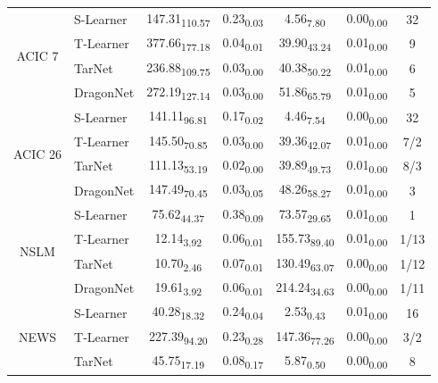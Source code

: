 \begin{table}[ht]
\begin{tabular}{c l cc cc c}
\hline
\multirow{4}{*}{ACIC 7}
& S-Learner  & 147.31\textsubscript{110.57} & 0.23\textsubscript{0.03} & 4.56\textsubscript{7.80} & 0.00\textsubscript{0.00} & 32 \\
& T-Learner  & 377.66\textsubscript{177.18} & 0.04\textsubscript{0.01} & 39.90\textsubscript{43.24} & 0.01\textsubscript{0.00} & 9 \\
& TarNet     & 236.88\textsubscript{109.75} & 0.03\textsubscript{0.00} & 40.38\textsubscript{50.22} & 0.01\textsubscript{0.00} & 6 \\
& DragonNet  & 272.19\textsubscript{127.14} & 0.03\textsubscript{0.00} & 51.86\textsubscript{65.79} & 0.01\textsubscript{0.00} & 5 \\
\hline
\multirow{4}{*}{ACIC 26}
& S-Learner  & 141.11\textsubscript{96.81} & 0.17\textsubscript{0.02} & 4.46\textsubscript{7.54} & 0.00\textsubscript{0.00} & 32 \\
& T-Learner  & 145.50\textsubscript{70.85} & 0.03\textsubscript{0.00} & 39.36\textsubscript{42.07} & 0.01\textsubscript{0.00} & 7/2 \\
& TarNet     & 111.13\textsubscript{53.19} & 0.02\textsubscript{0.00} & 39.89\textsubscript{49.73} & 0.01\textsubscript{0.00} & 8/3 \\
& DragonNet  & 147.49\textsubscript{70.45} & 0.03\textsubscript{0.05} & 48.26\textsubscript{58.27} & 0.01\textsubscript{0.00} & 3 \\
\hline
\multirow{4}{*}{NSLM}
& S-Learner  & 75.62\textsubscript{44.37} & 0.38\textsubscript{0.09} & 73.57\textsubscript{29.65} & 0.01\textsubscript{0.00} & 1 \\
& T-Learner  & 12.14\textsubscript{3.92} & 0.06\textsubscript{0.01} & 155.73\textsubscript{89.40} & 0.01\textsubscript{0.00} & 1/13 \\
& TarNet     & 10.70\textsubscript{2.46} & 0.07\textsubscript{0.01} & 130.49\textsubscript{63.07} & 0.00\textsubscript{0.00} & 1/12 \\
& DragonNet  & 19.61\textsubscript{3.92} & 0.06\textsubscript{0.01} & 214.24\textsubscript{34.63} & 0.00\textsubscript{0.00} & 1/11 \\
\hline
\multirow{4}{*}{NEWS}
& S-Learner  & 40.28\textsubscript{18.32} & 0.24\textsubscript{0.04} & 2.53\textsubscript{0.43} & 0.01\textsubscript{0.00} & 16 \\
& T-Learner  & 227.39\textsubscript{94.20} & 0.23\textsubscript{0.28} & 147.36\textsubscript{77.26} & 0.00\textsubscript{0.00} & 3/2 \\
& TarNet     & 45.75\textsubscript{17.19} & 0.08\textsubscript{0.17} & 5.87\textsubscript{0.50} & 0.00\textsubscript{0.00} & 8 \\

\end{tabular}
\end{table}
